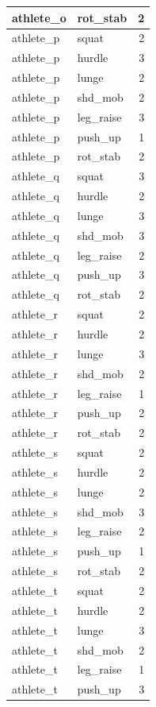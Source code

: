 \documentclass[
]{book}
\begin{document}
\begin{tabular}{l|l|r}
\hline
athlete\_o & rot\_stab & 2\\
\hline
athlete\_p & squat & 2\\
\hline
athlete\_p & hurdle & 3\\
\hline
athlete\_p & lunge & 2\\
\hline
athlete\_p & shd\_mob & 2\\
\hline
athlete\_p & leg\_raise & 3\\
\hline
athlete\_p & push\_up & 1\\
\hline
athlete\_p & rot\_stab & 2\\
\hline
athlete\_q & squat & 3\\
\hline
athlete\_q & hurdle & 2\\
\hline
athlete\_q & lunge & 3\\
\hline
athlete\_q & shd\_mob & 3\\
\hline
athlete\_q & leg\_raise & 2\\
\hline
athlete\_q & push\_up & 3\\
\hline
athlete\_q & rot\_stab & 2\\
\hline
athlete\_r & squat & 2\\
\hline
athlete\_r & hurdle & 2\\
\hline
athlete\_r & lunge & 3\\
\hline
athlete\_r & shd\_mob & 2\\
\hline
athlete\_r & leg\_raise & 1\\
\hline
athlete\_r & push\_up & 2\\
\hline
athlete\_r & rot\_stab & 2\\
\hline
athlete\_s & squat & 2\\
\hline
athlete\_s & hurdle & 2\\
\hline
athlete\_s & lunge & 2\\
\hline
athlete\_s & shd\_mob & 3\\
\hline
athlete\_s & leg\_raise & 2\\
\hline
athlete\_s & push\_up & 1\\
\hline
athlete\_s & rot\_stab & 2\\
\hline
athlete\_t & squat & 2\\
\hline
athlete\_t & hurdle & 2\\
\hline
athlete\_t & lunge & 3\\
\hline
athlete\_t & shd\_mob & 2\\
\hline
athlete\_t & leg\_raise & 1\\
\hline
athlete\_t & push\_up & 3\\

\end{tabular}
\end{document}
